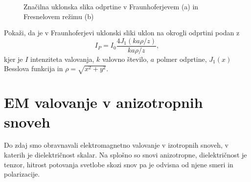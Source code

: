 \begin{figure}[h]
 \centering {} 
  
\caption{Značilna uklonska slika odprtine v Fraunhoferjevem (a) in Fresnelovem režimu (b)}
\label{fig:UklonFF}
\end{figure}

\begin{naloga}
\label{naloga-Frauhofer-Kirchhoff-uklon}
Pokaži, da je v Fraunhoferjevi uklonski sliki uklon na okrogli odprtini podan z
\begin{equation}
I_P = I_0\frac{4 J_1(k a \rho/ z)}{k a \rho/z},
\end{equation}
kjer je $I$ intenziteta valovanja, $k$ valovno število, $a$ polmer odprtine, 
$J_1(x)$ Besslova funkcija in $\rho = \sqrt{x^2+y^2}$.
\end{naloga}

\section{EM valovanje v anizotropnih snoveh}\label{chap:anizotropni}
Do zdaj smo obravnavali elektromagnetno valovanje
v izotropnih snoveh, v katerih je di\-elek\-tri\-čnost skalar. 
Na splošno so snovi anizotropne,
dielektričnost je tenzor, hitrost potovanja svetlobe 
skozi snov pa je odvisna od njene smeri in polarizacije.

